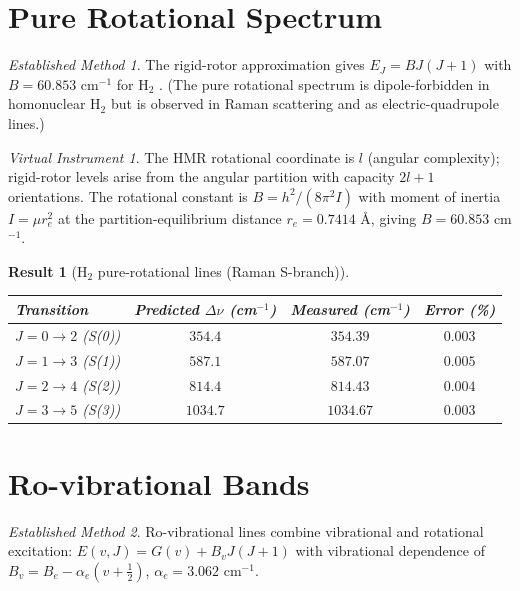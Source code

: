 \documentclass[twocolumn,11pt,a4paper]{article}
\theoremstyle{stmtstyle}
\newtheorem{result}{Result}
\theoremstyle{definition}
\theoremstyle{remark}
\newtheorem*{instrument}{Virtual Instrument}
\newtheorem*{established}{Established Method}
\begin{document}
\section{Pure Rotational Spectrum}
\label{sec:h2rot}

\begin{established}
The rigid-rotor approximation gives $E_{J}=BJ(J+1)$ with $B=60.853$ cm$^{-1}$ for H$_{2}$ \citep{stoicheff1957}. (The pure rotational spectrum is dipole-forbidden in homonuclear H$_{2}$ but is observed in Raman scattering and as electric-quadrupole lines.)
\end{established}

\begin{instrument}
The HMR rotational coordinate is $l$ (angular complexity); rigid-rotor levels arise from the angular partition with capacity $2l+1$ orientations. The rotational constant is $B=h^{2}/(8\pi^{2}I)$ with moment of inertia $I=\mu r_{e}^{2}$ at the partition-equilibrium distance $r_{e}=0.7414$ \AA, giving $B=60.853$ cm$^{-1}$.
\end{instrument}

\begin{result}[H$_{2}$ pure-rotational lines (Raman S-branch)]\label{res:h2rot}
\begin{center}\small
\begin{tabular}{lccc}
\toprule
Transition & Predicted $\Delta\nu$ (cm$^{-1}$) & Measured (cm$^{-1}$) & Error (\%)\\
\midrule
$J=0\to 2$ (S(0))  & $354.4$  & $354.39$  & $0.003$\\
$J=1\to 3$ (S(1))  & $587.1$  & $587.07$  & $0.005$\\
$J=2\to 4$ (S(2))  & $814.4$  & $814.43$  & $0.004$\\
$J=3\to 5$ (S(3))  & $1034.7$ & $1034.67$ & $0.003$\\
\bottomrule
\end{tabular}
\end{center}
\end{result}

\section{Ro-vibrational Bands}
\label{sec:h2rovib}

\begin{established}
Ro-vibrational lines combine vibrational and rotational excitation: $E(v,J)=G(v)+B_{v}J(J+1)$ with vibrational dependence of $B_{v}=B_{e}-\alpha_{e}(v+\tfrac{1}{2})$, $\alpha_{e}=3.062$ cm$^{-1}$.
\end{established}
\end{document}
